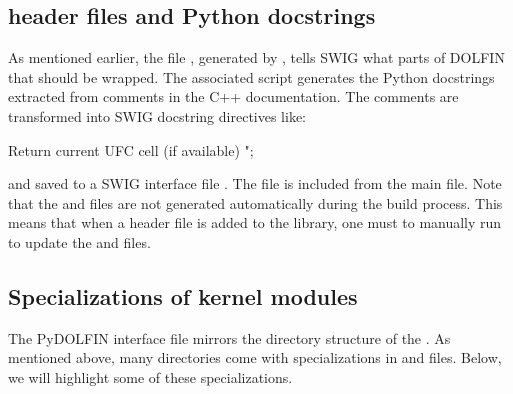 \subsection{\dolfin header files and Python docstrings}
As mentioned earlier, the file , generated by  
, tells SWIG what parts of DOLFIN that should be wrapped. 
The associated script  generates the Python
docstrings extracted from comments in the C++ documentation.  
The comments are transformed into SWIG docstring directives like:
\begin{c++}
Return current UFC cell (if available)
";
\end{c++}
and saved to a SWIG interface file . The
 file is included from the main  file.
Note that the  and  files are not
generated automatically during the build process. This means that when a 
header file is added to the \dolfin library, one must to manually run
 to update the  and  files.


\subsection{Specializations of kernel modules}
The PyDOLFIN interface file  
mirrors the directory structure of the . 
As mentioned above, many directories come with specializations in
 and  files.  
Below, we will highlight some of these specializations. 

